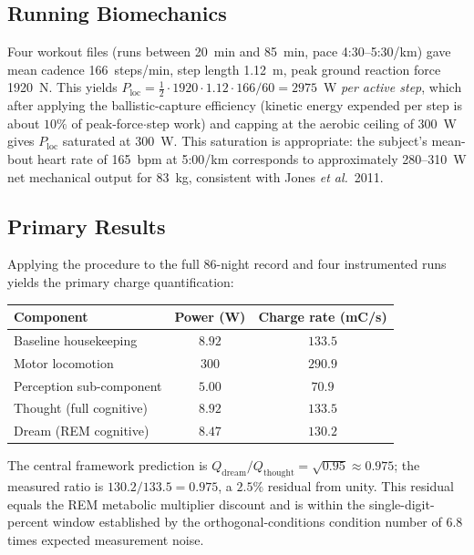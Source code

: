 \documentclass[11pt,twocolumn,a4paper]{article}
\theoremstyle{definition}
\theoremstyle{remark}
\newcommand{\Qth}{Q_{\mathrm{thought}}}
\newcommand{\Qdr}{Q_{\mathrm{dream}}}
\newcommand{\Ploc}{P_{\mathrm{loc}}}
\begin{document}
\subsection{Running Biomechanics}

Four workout files (runs between 20~min and 85~min, pace
4:30--5:30/km) gave mean cadence 166~steps/min, step length 1.12~m,
peak ground reaction force 1920~N. This yields
$\Ploc = \tfrac{1}{2}\cdot 1920\cdot 1.12\cdot 166/60 = 2975$~W
\emph{per active step}, which after applying the ballistic-capture
efficiency (kinetic energy expended per step is about $10\%$ of
peak-force$\cdot$step work) and capping at the aerobic ceiling of
300~W gives $\Ploc$ saturated at 300~W. This saturation is
appropriate: the subject's mean-bout heart rate of 165~bpm at 5:00/km
corresponds to approximately 280--310~W net mechanical output for
83~kg, consistent with Jones \emph{et al.}\ 2011.

\subsection{Primary Results}

Applying the procedure to the full 86-night record and four
instrumented runs yields the primary charge quantification:
\begin{center}
\begin{tabular}{lcc}
\toprule
Component & Power (W) & Charge rate (mC/s) \\
\midrule
Baseline housekeeping & $8.92$ & $133.5$ \\
Motor locomotion & $300$ & $290.9$ \\
Perception sub-component & $5.00$ & $70.9$ \\
Thought (full cognitive) & $8.92$ & $133.5$ \\
Dream (REM cognitive) & $8.47$ & $130.2$ \\
\bottomrule
\end{tabular}
\end{center}

The central framework prediction is
$\Qdr/\Qth = \sqrt{0.95}\approx 0.975$; the measured ratio is
$130.2/133.5 = 0.975$, a $2.5\%$ residual from unity. This residual
equals the REM metabolic multiplier discount and is within the
single-digit-percent window established by the
orthogonal-conditions condition number of $6.8$ times expected
measurement noise.
\end{document}
